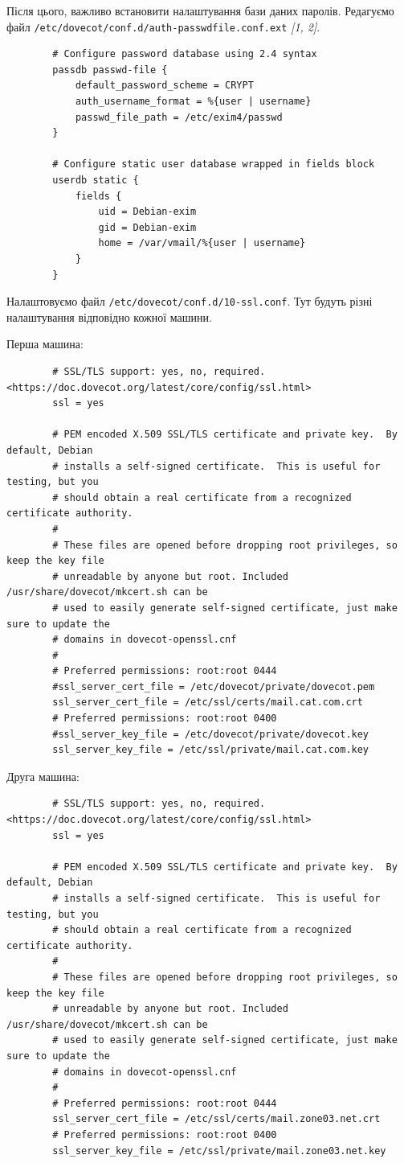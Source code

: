 \documentclass[14pt, a4paper]{extreport}
\begin{document}
	Після цього, важливо встановити налаштування бази даних паролів. Редагуємо файл \texttt{/etc/dovecot/conf.d/auth-passwdfile.conf.ext} \textit{[1, 2]}.
	
	\begin{verbatim}
		# Configure password database using 2.4 syntax
		passdb passwd-file {
			default_password_scheme = CRYPT
			auth_username_format = %{user | username}
			passwd_file_path = /etc/exim4/passwd
		}
		
		# Configure static user database wrapped in fields block
		userdb static {
			fields {
				uid = Debian-exim
				gid = Debian-exim
				home = /var/vmail/%{user | username}
			}
		}
	\end{verbatim}
	
	Налаштовуємо файл \texttt{/etc/dovecot/conf.d/10-ssl.conf}. Тут будуть різні налаштування відповідно кожної машини.
	
	Перша машина:
	
	\begin{verbatim}
		# SSL/TLS support: yes, no, required. <https://doc.dovecot.org/latest/core/config/ssl.html>
		ssl = yes
		
		# PEM encoded X.509 SSL/TLS certificate and private key.  By default, Debian
		# installs a self-signed certificate.  This is useful for testing, but you
		# should obtain a real certificate from a recognized certificate authority.
		#
		# These files are opened before dropping root privileges, so keep the key file
		# unreadable by anyone but root. Included /usr/share/dovecot/mkcert.sh can be
		# used to easily generate self-signed certificate, just make sure to update the
		# domains in dovecot-openssl.cnf
		# 
		# Preferred permissions: root:root 0444
		#ssl_server_cert_file = /etc/dovecot/private/dovecot.pem
		ssl_server_cert_file = /etc/ssl/certs/mail.cat.com.crt
		# Preferred permissions: root:root 0400
		#ssl_server_key_file = /etc/dovecot/private/dovecot.key
		ssl_server_key_file = /etc/ssl/private/mail.cat.com.key
	\end{verbatim}
	
	Друга машина:
	
	\begin{verbatim}
		# SSL/TLS support: yes, no, required. <https://doc.dovecot.org/latest/core/config/ssl.html>
		ssl = yes
		
		# PEM encoded X.509 SSL/TLS certificate and private key.  By default, Debian
		# installs a self-signed certificate.  This is useful for testing, but you
		# should obtain a real certificate from a recognized certificate authority.
		#
		# These files are opened before dropping root privileges, so keep the key file
		# unreadable by anyone but root. Included /usr/share/dovecot/mkcert.sh can be
		# used to easily generate self-signed certificate, just make sure to update the
		# domains in dovecot-openssl.cnf
		# 
		# Preferred permissions: root:root 0444
		ssl_server_cert_file = /etc/ssl/certs/mail.zone03.net.crt
		# Preferred permissions: root:root 0400
		ssl_server_key_file = /etc/ssl/private/mail.zone03.net.key
	\end{verbatim}
	
\end{document}
